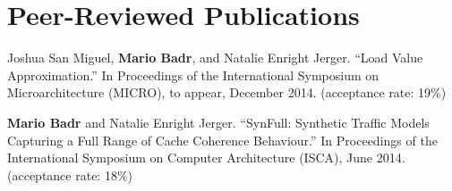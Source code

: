 \section{\sc Peer-Reviewed Publications}

Joshua San Miguel, \textbf{Mario Badr}, and Natalie Enright Jerger. 
“Load Value Approximation.” 
In Proceedings of the International Symposium on Microarchitecture (MICRO), to appear, December 2014.
(acceptance rate: 19\%)

\textbf{Mario Badr} and Natalie Enright Jerger. 
“SynFull: Synthetic Traffic Models Capturing a Full Range of Cache Coherence Behaviour.” 
In Proceedings of the International Symposium on Computer Architecture (ISCA), June 2014.
(acceptance rate: 18\%)